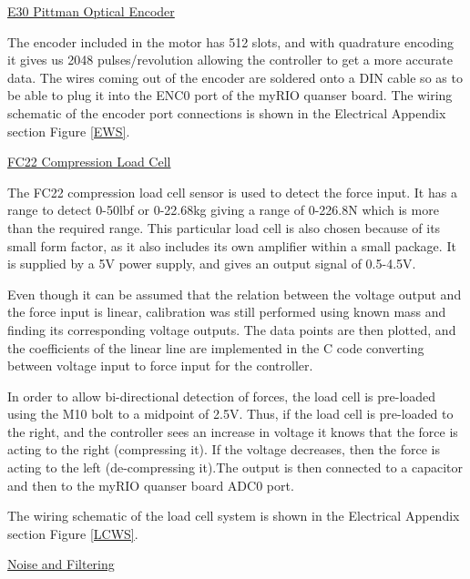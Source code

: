 \vspace{.167in}
\noindent\underline{E30 Pittman Optical Encoder}\par
\vspace{.08in}
The encoder included in the motor has 512 slots, and with quadrature encoding it gives us 2048 pulses/revolution allowing the controller to get a more accurate data. The wires coming out of the encoder are soldered onto a DIN cable so as to be able to plug it into the ENC0 port of the myRIO quanser board. The wiring schematic of the encoder port connections is shown in the Electrical Appendix section Figure \ref{EWS}. \par 
\vspace{.167in}
\noindent\underline{FC22 Compression Load Cell}\par
\vspace{.08in}
The FC22 compression load cell sensor is used to detect the force input. It has a range to detect 0-50lbf or 0-22.68kg giving a range of 0-226.8N which is more than the required range. This particular load cell is also chosen because of its small form factor, as it also includes its own amplifier within a small package. It is supplied by a 5V power supply, and gives an output signal of 0.5-4.5V. \par
Even though it can be assumed that the relation between the voltage output and the force input is linear, calibration was still performed using known mass and finding its corresponding voltage outputs. The data points are then plotted, and the coefficients of the linear line are implemented in the C code converting between voltage input to force input for the controller. \par
In order to allow bi-directional detection of forces, the load cell is pre-loaded using the M10 bolt to a midpoint of 2.5V. Thus, if the load cell is pre-loaded to the right, and the controller sees an increase in voltage it knows that the force is acting to the right (compressing it). If the voltage decreases, then the force is acting to the left (de-compressing it).The output is then connected to a capacitor and then to the myRIO quanser board ADC0 port. \par
The wiring schematic of the load cell system is shown in the Electrical Appendix section Figure \ref{LCWS}. \par
\vspace{.167in}
\noindent\underline{Noise and Filtering}\par
\vspace{.08in}
